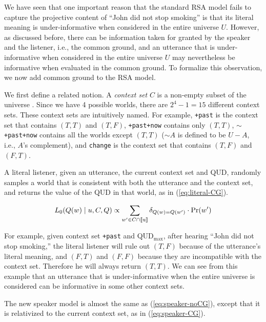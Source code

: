 We have seen that one important reason that the standard RSA model fails to 
 capture the projective content of ``John did not stop smoking'' is that its literal
 meaning is under-informative when considered in the entire universe $U$.
However, as discussed before, there can be information taken for granted by the
 speaker and the listener, i.e., the common ground, 
and an utterance that is under-informative when considered in the entire universe $U$ may 
 nevertheless be informative when evaluated in the common ground.
To formalize this observation, we now add common ground to the RSA model.

We first define a related notion. 
A \emph{context set} $C$ is a non-empty subset of the universe \cite{Stalnaker1974:Pragmatic-Presuppositions}.
Since we have 4 possible worlds, there are $2^4-1=15$ different context sets.
These context sets are intuitively named. 
For example, \verb=+past= is the context set
 that contains $(T, T)$ and $(T, F)$,
\verb=+past+now= contains only $(T, T)$,
$\sim$\verb=+past+now= contains all the worlds except $(T, T)$ ($\sim A$ is defined to be $U-A$, i.e., $A$'s complement), 
and \verb=change= is the context set that contains $(T, F)$ 
 and $(F, T)$.

A literal listener, given an utterance, the current context set and QUD, 
 randomly samples a world that is consistent with both the utterance and 
 the context set, and returns the value of the QUD in that world, as in  
 (\ref{eq:literal-CG}).

\vspace{-6pt}
\begin{equation}
L_0(Q(w) \mid u, C, Q) \propto  \sum_{w'\in C\cap \llbracket \text{u} \rrbracket} \delta_{Q(w)=Q(w')} \cdot \Pr(w') \label{eq:literal-CG}
\end{equation}

For example, given context set \verb=+past= and QUD$_\text{max}$, 
 after hearing ``John did not stop smoking,'' the literal listener will rule out 
 $(T, F)$ because of the utterance's literal meaning, and 
 $(F, T)$ and $(F, F)$ because 
 they are incompatible with the context set.
Therefore he will always return $(T, T)$.
We can see from this example that an utterance that is under-informative 
 when the entire universe is considered can be informative in some other 
 context sets.

The new speaker model is almost the same as (\ref{eq:speaker-noCG}), except that 
 it is relativized to the current context set, as in (\ref{eq:speaker-CG}).

